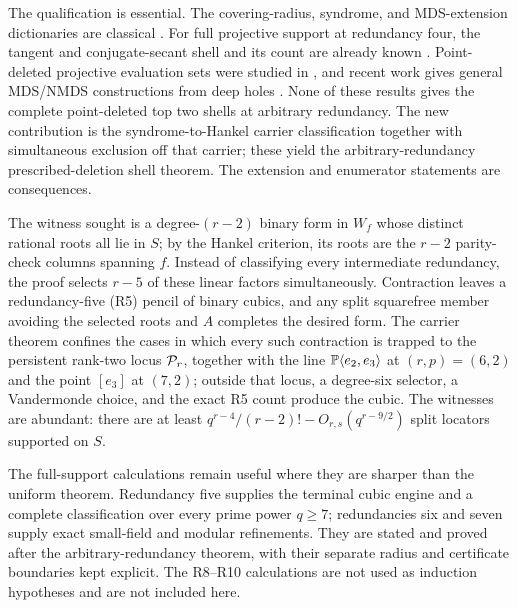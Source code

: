The qualification is essential.  The covering-radius, syndrome, and
MDS-extension dictionaries are classical
\cite{SeroussiRoth1986,Dur1994,Kaipa2017,WuDingChen2023}.  For full projective
support at redundancy four, the tangent and conjugate-secant shell and its
count are already known
\cite{ZWK2020,BPS2022,DMPCosets2021}.  Point-deleted projective evaluation
sets were studied in \cite{XuHongXu2017}, and recent work gives general
MDS/NMDS constructions from deep holes \cite{LiLuLingLam2026}.  None of these
results gives the complete point-deleted top two shells at arbitrary
redundancy.  The new contribution is the
syndrome-to-Hankel carrier classification together with simultaneous
exclusion off that carrier; these yield the arbitrary-redundancy
prescribed-deletion shell theorem.  The extension and enumerator statements
are consequences.

The witness sought is a degree-\((r-2)\) binary form in \(W_f\) whose distinct
rational roots all lie in \(S\); by the Hankel criterion, its roots are the
\(r-2\) parity-check columns spanning \(f\).  Instead of classifying every
intermediate redundancy, the proof selects \(r-5\) of these linear factors
simultaneously.  Contraction leaves a redundancy-five (R5) pencil of binary
cubics, and any split squarefree member avoiding the selected roots and \(A\)
completes the desired form.  The carrier theorem confines the cases in which
every such contraction is trapped to the persistent rank-two locus \(\mathcal P_r\),
together with the line \(\mathbb P\langle e_2,e_3\rangle\) at \((r,p)=(6,2)\)
and the point \([e_3]\) at \((7,2)\); outside that locus, a
degree-six selector, a Vandermonde choice, and the exact R5 count produce the
cubic.  The witnesses are abundant: there are at least
\(q^{r-4}/(r-2)!-O_{r,s}(q^{r-9/2})\) split locators supported on \(S\).

The full-support calculations remain useful where they are sharper than the
uniform theorem.  Redundancy five supplies the terminal cubic engine and a
complete classification over every prime power \(q\geq7\); redundancies six
and seven supply exact small-field and modular refinements.  They are stated
and proved after the arbitrary-redundancy theorem, with their separate radius
and certificate boundaries kept explicit.  The R8--R10 calculations are not
used as induction hypotheses and are not included here.
